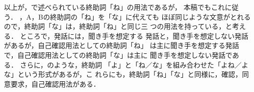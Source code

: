 以上が，\cite{kinsui93-3}で述べられている終助詞「ね」の用法であるが，
本稿でもこれに従う．
，A，Bの終助詞の「ね」を「な」に代えても
ほぼ同じような文意がとれるので，終助詞「な」は，終助詞「ね」と同じ三
つの用法を持っている，と考える．  ところで，発話には，聞き手を想定する
発話と，聞き手を想定しない発話があるが，自己確認用法としての終助詞「ね」
は主に聞き手を想定する発話で，自己確認用法としての終助詞「な」は主に
聞き手を想定しない発話である．  さらに，のような，終助詞
「よ」と「ね／な」を組み合わせた「よね／よな」という形式があるが，こ
れらにも，終助詞「ね」「な」と同様に，確認，同意要求，自己確認用法がある．
\label{megane}
